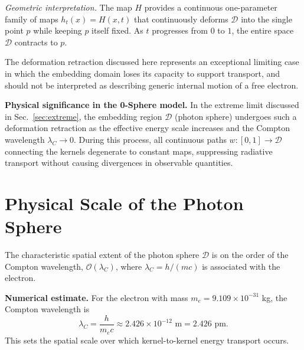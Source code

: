 \documentclass[%
 reprint,
 amsmath,amssymb,
 aps,
 prb,
]{revtex4-2}
\numberwithin{equation}{section}
\begin{document}


\medskip
\noindent\textit{Geometric interpretation.}
The map $H$ provides a continuous one-parameter family of maps $h_t(x) = H(x,t)$ that continuously deforms $\mathcal{D}$ into the single point $p$ while keeping $p$ itself fixed. As $t$ progresses from $0$ to $1$, the entire space $\mathcal{D}$ contracts to $p$.

The deformation retraction discussed here represents an exceptional limiting case in which the embedding domain loses its capacity to support transport, and should not be interpreted as describing generic internal motion of a free electron.


\medskip
\noindent\textbf{Physical significance in the 0-Sphere model.}
In the extreme limit discussed in Sec.~\ref{sec:extreme}, the embedding region $\mathcal{D}$ (photon sphere) undergoes such a deformation retraction as the effective energy scale increases and the Compton wavelength $\lambda_C \to 0$. During this process, all continuous paths $w : [0,1] \to \mathcal{D}$ connecting the kernels degenerate to constant maps, suppressing radiative transport without causing divergences in observable quantities.

\section{Physical Scale of the Photon Sphere}
\label{sec:appendix_physical_scale}

The characteristic spatial extent of the photon sphere $\mathcal{D}$ is on the order of the Compton wavelength, $\mathcal{O}(\lambda_C)$, where $\lambda_C = h/(mc)$ is associated with the electron.

\medskip
\noindent\textbf{Numerical estimate.}
For the electron with mass $m_e = 9.109 \times 10^{-31}$ kg, the Compton wavelength is
\begin{equation}
\lambda_C = \frac{h}{m_e c} \approx 2.426 \times 10^{-12} \text{ m} = 2.426 \text{ pm}.
\end{equation}
This sets the spatial scale over which kernel-to-kernel energy transport occurs.
\end{document}
